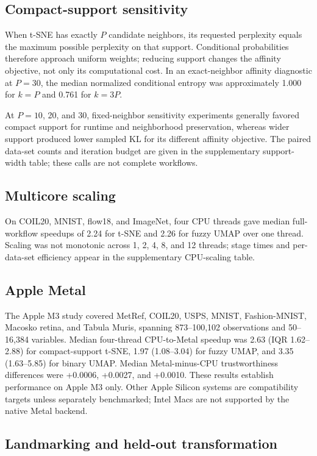 \documentclass[article]{jss}
\begin{document}
\subsection{Compact-support sensitivity}

When t-SNE has exactly $P$ candidate neighbors, its requested perplexity
equals the maximum possible perplexity on that support. Conditional
probabilities therefore approach uniform weights; reducing support changes
the affinity objective, not only its computational cost. In an exact-neighbor
affinity diagnostic at $P=30$, the median normalized conditional entropy was
approximately 1.000 for $k=P$ and 0.761 for $k=3P$.

At $P=10$, 20, and 30, fixed-neighbor sensitivity experiments generally
favored compact support for runtime and neighborhood preservation, whereas
wider support produced lower sampled KL for its different affinity objective.
The paired data-set counts and iteration budget are given in the
supplementary support-width table; these calls are not complete
workflows.

\subsection{Multicore scaling}

On COIL20, MNIST, flow18, and ImageNet, four CPU threads gave median
full-workflow speedups of 2.24 for t-SNE and 2.26 for fuzzy UMAP over one
thread. Scaling was not monotonic across 1, 2, 4, 8, and 12 threads; stage
times and per-data-set efficiency appear in the supplementary
CPU-scaling table.

\subsection{Apple Metal}

The Apple M3 study covered MetRef, COIL20, USPS, MNIST, Fashion-MNIST,
Macosko retina, and Tabula Muris, spanning 873--100,102 observations and
50--16,384 variables. Median four-thread CPU-to-Metal speedup was 2.63
(IQR 1.62--2.88) for compact-support t-SNE, 1.97 (1.08--3.04) for fuzzy UMAP,
and 3.35
(1.63--5.85) for binary UMAP. Median Metal-minus-CPU trustworthiness
differences were +0.0006, +0.0027, and +0.0010. These results establish
performance on Apple M3 only. Other Apple Silicon systems are compatibility
targets unless separately benchmarked; Intel Macs are not supported by the
native Metal backend.

\subsection{Landmarking and held-out transformation}
\end{document}
